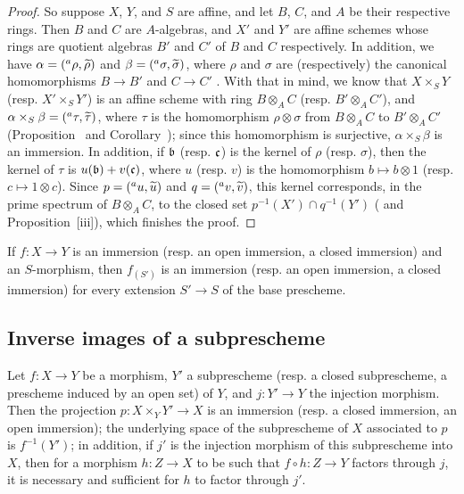 \begin{proof}
So suppose $X$, $Y$, and $S$ are affine, and let $B$, $C$, and $A$ be their respective rings.
Then $B$ and $C$ are $A$-algebras, and $X'$ and $Y'$ are affine schemes whose rings are quotient algebras $B'$ and $C'$ of $B$ and $C$ respectively.
In addition, we have $\alpha=({}^a\rho,{\widetilde{\rho}})$ and $\beta=({}^a\sigma,{\widetilde{\sigma}})$, where $\rho$ and $\sigma$ are (respectively) the canonical homomorphisms $B\to B'$ and $C\to C'$ .
With that in mind, we know that $X\times_S Y$ (resp. $X'\times_S Y'$) is an affine scheme with ring $B\otimes_A C$ (resp. $B'\otimes_A C'$), and $\alpha\times_S\beta=({}^a\tau,{\widetilde{\tau}})$, where $\tau$ is the homomorphism $\rho\otimes\sigma$ from $B\otimes_A C$ to $B'\otimes_A C'$ (Proposition~ and Corollary~);
since this homomorphism is surjective, $\alpha\times_S\beta$ is an immersion.
In addition, if $\mathfrak{b}$ (resp. $\mathfrak{c}$) is the kernel of $\rho$ (resp. $\sigma$), then the kernel of $\tau$ is $u(\mathfrak{b})+v(\mathfrak{c})$, where $u$ (resp. $v$) is the homomorphism $b\mapsto b\otimes 1$ (resp. $c\mapsto 1\otimes c$).
Since $p=({}^a u,{\widetilde{u}})$ and $q=({}^a v,{\widetilde{v}})$, this kernel corresponds, in the prime spectrum of $B\otimes_A C$, to the closed set $p^{-1}(X')\cap q^{-1}(Y')$ ( and Proposition~[iii]), which finishes the proof.
\end{proof}

\begin{cor}[4.3.2]
\label{1.4.3.2}
If $f:X\to Y$ is an immersion (resp. an open immersion, a closed immersion) and an $S$-morphism, then $f_{(S')}$ is an immersion (resp. an open immersion, a closed immersion) for every extension $S'\to S$ of the base prescheme.
\end{cor}

\subsection{Inverse images of a subprescheme}
\label{subsection:inverse-image-of-subprescheme}

\begin{prop}[4.4.1]
\label{1.4.4.1}
Let $f:X\to Y$ be a morphism, $Y'$ a subprescheme (resp. a closed subprescheme, a prescheme induced by an open set) of $Y$, and $j:Y'\to Y$ the injection morphism.
Then the projection $p:X\times_Y Y'\to X$ is an immersion (resp. a closed immersion, an open immersion);
the underlying space of the subprescheme of $X$ associated to $p$ is $f^{-1}(Y')$;
in addition, if $j'$ is the injection morphism of this subprescheme into $X$, then for a morphism $h:Z\to X$ to be such that $f\circ h:Z\to Y$ factors through $j$, it is necessary and sufficient for $h$ to factor through $j'$.
\end{prop}

